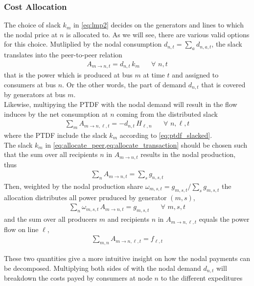 \documentclass[11pt]{article}
\newcommand{\generation}[1][n]{g_{#1,s,t}}
\newcommand{\generationshare}[1][n]{\omega_{#1,s,t}}
\newcommand{\demand}[1][n]{d_{#1,a,t}}
\newcommand{\demandnodal}[1][n]{d_{#1,t}}
\newcommand{\ptdf}[1][n]{H_{\ell,#1}}
\newcommand{\slack}[1][n]{k_{#1}}
\newcommand{\flow}{f_{\ell,t}}
\newcommand{\allocatePeer}[1][m \rightarrow n]{A_{#1,t}}
\newcommand{\allocateTransaction}[1][m \rightarrow n]{A_{#1,\ell,t}}
\newcommand{\Forall}[1]{\hspace{20pt} \forall \,\, #1 }
\begin{document}
\subsubsection*{Cost Allocation}

The choice of slack $\slack[m]$ in \cref{eq:lmp2} decides on the generators and lines to which the nodal price at $n$ is allocated to. As we will see, there are various valid options for this choice. Mutliplied by the nodal consumption $\demandnodal = \sum_a \demand$, the slack translates into the peer-to-peer relation 
\begin{align}
 \allocatePeer = \demandnodal \, \slack[m]   \Forall{n,t}
 \label{eq:allocate_peer}
\end{align}
that is the power which is produced at bus $m$ at time $t$ and assigned to consumers at bus $n$. Or the other words, the part of demand $\demandnodal$ that is covered by generators at bus $m$. \\ 

Likewise, multipying the PTDF with the nodal demand will result in the flow induces by the net consumption at $n$ coming from the distributed slack 
\begin{align}
 \sum_m \allocateTransaction = - \demandnodal  \, \ptdf \Forall{n,\ell,t}  
 \label{eq:allocate_transaction}
\end{align}
where the PTDF include the slack $\slack[m]$ according to \cref{eq:ptdf_slacked}. \\

The slack $\slack[m]$ in \cref{eq:allocate_peer,eq:allocate_transaction} should be chosen such that the sum over all recipients $n$ in $\allocatePeer$ results in the nodal production, thus
\begin{align}
 \sum_n \allocatePeer = \sum_s \generation
\end{align}
Then, weighted by the nodal production share $\generationshare[m] = \generation[m]/\sum_s \generation[m]$ the allocation distributes all power pruduced by generator $(m,s)$,
\begin{align}
  \sum_n \generationshare[m] \, \allocatePeer = \generation[m] \Forall{m,s,t}
  \label{eq:recipients_sum}
\end{align}
and the sum over all producers $m$ and recipients $n$ in $\allocateTransaction$ equals the power flow on line $\ell$,
\begin{align}
 \sum_{m,n} \allocateTransaction = \flow
\end{align}


These two quantities give a more intuitive insight on how the nodal payments can be decomposed. Multiplying both sides of   with the nodal demand $\demandnodal$ will breakdown the costs payed by consumers at node $n$ to the different expeditures
\end{document}
